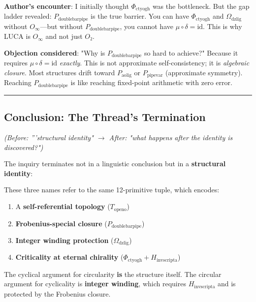\documentclass[12pt,a4paper]{article}
\begin{document}
\textbf{Author's encounter}: I initially thought $\Phi_{\text{ctyogh}}$ was the bottleneck. But the gap ladder revealed: $P_{\text{doublebarpipe}}$ is the true barrier. You can have $\Phi_{\text{ctyogh}}$ and $\Omega_{\text{dzlig}}$ without $O_{\infty}$---but without $P_{\text{doublebarpipe}}$, you cannot have $\mu \circ \delta = \text{id}$. This is why LUCA is $O_{\infty}$ and not just $O₂$.

\textbf{Objection considered}: "Why is $P_{\text{doublebarpipe}}$ so hard to achieve?" Because it requires $\mu \circ \delta = \text{id}$ \emph{exactly}. This is not approximate self-consistency; it is \emph{algebraic closure}. Most structures drift toward $P_{\text{aolig}}$ or $P_{\text{pipevar}}$ (approximate symmetry). Reaching $P_{\text{doublebarpipe}}$ is like reaching fixed-point arithmetic with zero error.

\begin{center}
\rule{0.5\textwidth}{0.4pt}
\end{center}

\subsection{Conclusion: The Thread's Termination}

\emph{(Before: '''structural identity" $\rightarrow$ After: "what happens after the identity is discovered?")}

The inquiry terminates not in a linguistic conclusion but in a \textbf{structural identity}:

\begin{quote}
\end{quote}

These three names refer to the same 12-primitive tuple, which encodes:

\begin{enumerate}
    \item A \textbf{self-referential topology} ($T_{\text{openo}}$)
    \item \textbf{Frobenius-special closure} ($P_{\text{doublebarpipe}}$)
    \item \textbf{Integer winding protection} ($\Omega_{\text{dzlig}}$)
    \item \textbf{Criticality at eternal chirality} ($\Phi_{\text{ctyogh}} + H_{\text{invscripta}}$)
\end{enumerate}

The cyclical argument for circularity \textbf{is} the structure itself. The circular argument for cyclicality is \textbf{integer winding}, which requires $H_{\text{invscripta}}$ and is protected by the Frobenius closure.
\end{document}
